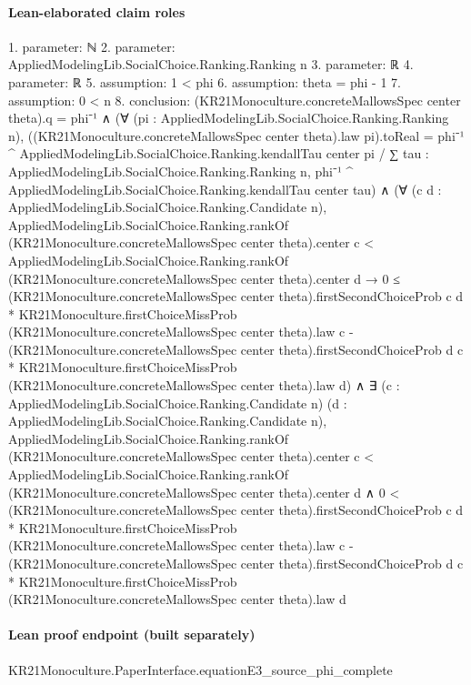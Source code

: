 \documentclass[10pt]{article}
\begin{document}
\paragraph{Lean-elaborated claim roles}\begin{ReviewVerbatim}
1. parameter: ℕ
2. parameter: AppliedModelingLib.SocialChoice.Ranking.Ranking n
3. parameter: ℝ
4. parameter: ℝ
5. assumption: 1 < phi
6. assumption: theta = phi - 1
7. assumption: 0 < n
8. conclusion: (KR21Monoculture.concreteMallowsSpec center theta).q = phi⁻¹ ∧
  (∀ (pi : AppliedModelingLib.SocialChoice.Ranking.Ranking n),
      ((KR21Monoculture.concreteMallowsSpec center theta).law pi).toReal =
        phi⁻¹ ^ AppliedModelingLib.SocialChoice.Ranking.kendallTau center pi /
          ∑ tau : AppliedModelingLib.SocialChoice.Ranking.Ranking n,
            phi⁻¹ ^ AppliedModelingLib.SocialChoice.Ranking.kendallTau center tau) ∧
    (∀ (c d : AppliedModelingLib.SocialChoice.Ranking.Candidate n),
        AppliedModelingLib.SocialChoice.Ranking.rankOf (KR21Monoculture.concreteMallowsSpec center theta).center c <
            AppliedModelingLib.SocialChoice.Ranking.rankOf (KR21Monoculture.concreteMallowsSpec center theta).center d →
          0 ≤
            (KR21Monoculture.concreteMallowsSpec center theta).firstSecondChoiceProb c d *
                KR21Monoculture.firstChoiceMissProb (KR21Monoculture.concreteMallowsSpec center theta).law c -
              (KR21Monoculture.concreteMallowsSpec center theta).firstSecondChoiceProb d c *
                KR21Monoculture.firstChoiceMissProb (KR21Monoculture.concreteMallowsSpec center theta).law d) ∧
      ∃ (c : AppliedModelingLib.SocialChoice.Ranking.Candidate n) (d :
        AppliedModelingLib.SocialChoice.Ranking.Candidate n),
        AppliedModelingLib.SocialChoice.Ranking.rankOf (KR21Monoculture.concreteMallowsSpec center theta).center c <
            AppliedModelingLib.SocialChoice.Ranking.rankOf (KR21Monoculture.concreteMallowsSpec center theta).center d ∧
          0 <
            (KR21Monoculture.concreteMallowsSpec center theta).firstSecondChoiceProb c d *
                KR21Monoculture.firstChoiceMissProb (KR21Monoculture.concreteMallowsSpec center theta).law c -
              (KR21Monoculture.concreteMallowsSpec center theta).firstSecondChoiceProb d c *
                KR21Monoculture.firstChoiceMissProb (KR21Monoculture.concreteMallowsSpec center theta).law d
\end{ReviewVerbatim}

\paragraph{Lean proof endpoint (built separately)}\begin{ReviewVerbatim}
KR21Monoculture.PaperInterface.equationE3_source_phi_complete
\end{ReviewVerbatim}
\end{document}
